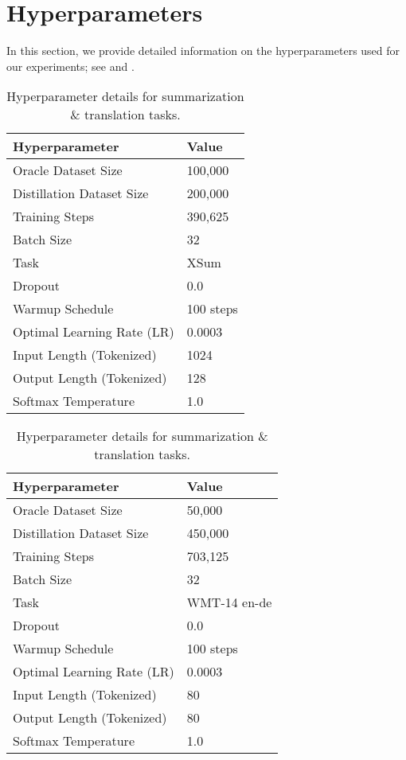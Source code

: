 \section{Hyperparameters}\label{sec:hyperparameters}

In this section, we provide detailed information on the hyperparameters used for our experiments; see  and . 

\begin{table}[h!]
\centering
\caption{Hyperparameter details for summarization \& translation tasks.}
\begin{tabular}{@{}ll@{}}
\toprule
\textbf{Hyperparameter} & \textbf{Value} \\ \midrule
Oracle Dataset Size     & 100,000       \\
Distillation Dataset Size & 200,000     \\
Training Steps          & 390,625         \\
Batch Size              & 32            \\
Task                    & XSum \\
Dropout                 & 0.0            \\
Warmup Schedule         & 100 steps      \\
Optimal Learning Rate (LR)  & 0.0003         \\
Input Length (Tokenized)    & 1024           \\
Output Length (Tokenized)   & 128           \\
Softmax Temperature     & 1.0      \\ \bottomrule
\end{tabular}
\qquad\qquad\qquad
\begin{tabular}{@{}ll@{}}
\toprule
\textbf{Hyperparameter} & \textbf{Value} \\ \midrule
Oracle Dataset Size     & 50,000       \\
Distillation Dataset Size & 450,000     \\
Training Steps          & 703,125         \\
Batch Size              & 32            \\
Task                    & WMT-14 en-de  \\
Dropout                 & 0.0            \\
Warmup Schedule         & 100 steps      \\
Optimal Learning Rate (LR)  & 0.0003         \\
Input Length (Tokenized)    & 80           \\
Output Length (Tokenized)   & 80           \\
Softmax Temperature     & 1.0      \\ \bottomrule
\end{tabular}
\label{tab:hyperparams_xsum_wmt}
\end{table}

